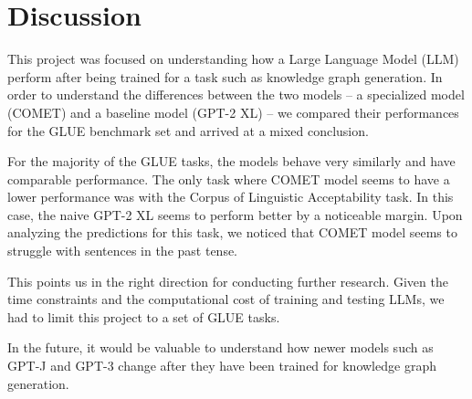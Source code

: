 \documentclass[\main/thesis.tex]{subfiles}
\begin{document}
\chapter{Discussion}

This project was focused on understanding how a Large Language Model (LLM) perform after being trained 
for a task such as knowledge graph generation. In order to understand the differences 
between the two models 
-- a specialized model (COMET) and a baseline model (GPT-2 XL) --
we compared their performances for the GLUE benchmark set and arrived at a mixed conclusion. 

For the majority of the GLUE tasks, the models behave very similarly and have comparable performance. The only task where 
COMET model seems to have a lower performance was with the Corpus of Linguistic Acceptability task. In this case, the naive 
GPT-2 XL seems to perform better by a noticeable margin. Upon analyzing the predictions for this task, we noticed that 
COMET model seems to struggle with sentences in the past tense. 

This points us in the right direction for conducting further research. Given the time constraints and the 
computational cost of training and testing LLMs, we had to limit this project to a set of GLUE tasks. 

In the future, it would be valuable to understand how newer models such as GPT-J and GPT-3 change after
they have been trained for knowledge graph generation. 
\end{document}
